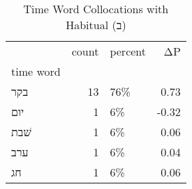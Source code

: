 \begin{table}[htbp!]
\centering
\caption{Time Word Collocations with Habitual (ב)}
\label{table:habב_head_cpd}
\begin{tabular}{lrlr}
\toprule
{} &  count & percent &    ΔP \\
time word &        &         &       \\
\midrule
בקר       &     13 &     76\% &  0.73 \\
יום       &      1 &      6\% & -0.32 \\
שׁבת      &      1 &      6\% &  0.06 \\
ערב       &      1 &      6\% &  0.04 \\
חג        &      1 &      6\% &  0.06 \\
\bottomrule
\end{tabular}
\end{table}
